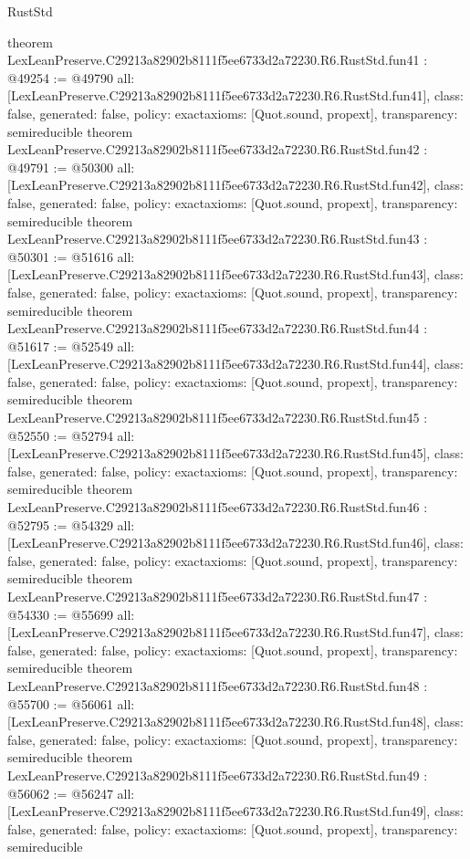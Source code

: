 \begin{lexlean}{RustStd}
\begin{coremodule}
{}
theorem LexLeanPreserve.C29213a82902b8111f5ee6733d2a72230.R6.RustStd.fun41 : @49254 := @49790 {
  all: [LexLeanPreserve.C29213a82902b8111f5ee6733d2a72230.R6.RustStd.fun41],
  class: false,
  generated: false,
  policy: exact{axioms: [Quot.sound, propext]},
  transparency: semireducible
}
theorem LexLeanPreserve.C29213a82902b8111f5ee6733d2a72230.R6.RustStd.fun42 : @49791 := @50300 {
  all: [LexLeanPreserve.C29213a82902b8111f5ee6733d2a72230.R6.RustStd.fun42],
  class: false,
  generated: false,
  policy: exact{axioms: [Quot.sound, propext]},
  transparency: semireducible
}
theorem LexLeanPreserve.C29213a82902b8111f5ee6733d2a72230.R6.RustStd.fun43 : @50301 := @51616 {
  all: [LexLeanPreserve.C29213a82902b8111f5ee6733d2a72230.R6.RustStd.fun43],
  class: false,
  generated: false,
  policy: exact{axioms: [Quot.sound, propext]},
  transparency: semireducible
}
theorem LexLeanPreserve.C29213a82902b8111f5ee6733d2a72230.R6.RustStd.fun44 : @51617 := @52549 {
  all: [LexLeanPreserve.C29213a82902b8111f5ee6733d2a72230.R6.RustStd.fun44],
  class: false,
  generated: false,
  policy: exact{axioms: [Quot.sound, propext]},
  transparency: semireducible
}
theorem LexLeanPreserve.C29213a82902b8111f5ee6733d2a72230.R6.RustStd.fun45 : @52550 := @52794 {
  all: [LexLeanPreserve.C29213a82902b8111f5ee6733d2a72230.R6.RustStd.fun45],
  class: false,
  generated: false,
  policy: exact{axioms: [Quot.sound, propext]},
  transparency: semireducible
}
theorem LexLeanPreserve.C29213a82902b8111f5ee6733d2a72230.R6.RustStd.fun46 : @52795 := @54329 {
  all: [LexLeanPreserve.C29213a82902b8111f5ee6733d2a72230.R6.RustStd.fun46],
  class: false,
  generated: false,
  policy: exact{axioms: [Quot.sound, propext]},
  transparency: semireducible
}
theorem LexLeanPreserve.C29213a82902b8111f5ee6733d2a72230.R6.RustStd.fun47 : @54330 := @55699 {
  all: [LexLeanPreserve.C29213a82902b8111f5ee6733d2a72230.R6.RustStd.fun47],
  class: false,
  generated: false,
  policy: exact{axioms: [Quot.sound, propext]},
  transparency: semireducible
}
theorem LexLeanPreserve.C29213a82902b8111f5ee6733d2a72230.R6.RustStd.fun48 : @55700 := @56061 {
  all: [LexLeanPreserve.C29213a82902b8111f5ee6733d2a72230.R6.RustStd.fun48],
  class: false,
  generated: false,
  policy: exact{axioms: [Quot.sound, propext]},
  transparency: semireducible
}
theorem LexLeanPreserve.C29213a82902b8111f5ee6733d2a72230.R6.RustStd.fun49 : @56062 := @56247 {
  all: [LexLeanPreserve.C29213a82902b8111f5ee6733d2a72230.R6.RustStd.fun49],
  class: false,
  generated: false,
  policy: exact{axioms: [Quot.sound, propext]},
  transparency: semireducible
}
\end{coremodule}
\end{lexlean}
